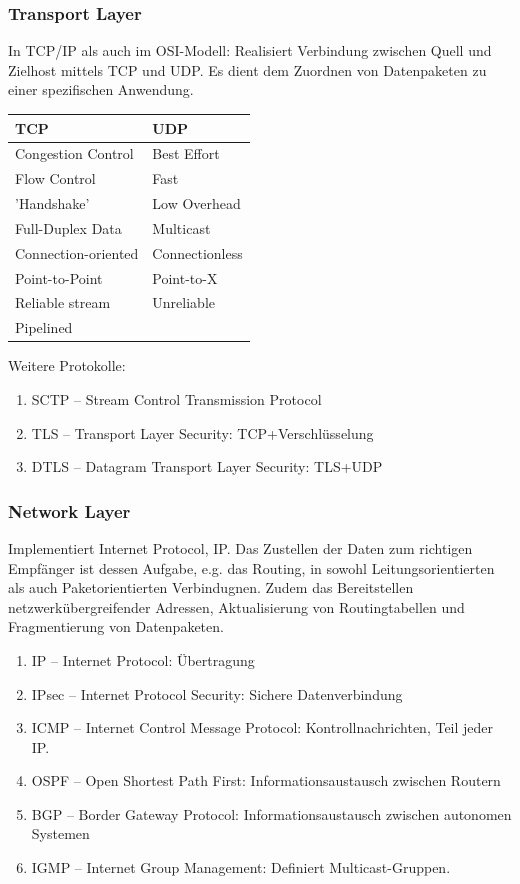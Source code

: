 \documentclass{article}
\begin{document}
    \subsubsection{Transport Layer}
    In TCP/IP als auch im OSI-Modell: Realisiert Verbindung zwischen Quell und Zielhost mittels TCP und UDP. Es dient dem Zuordnen von Datenpaketen zu einer spezifischen Anwendung.
    \begin{center}
        \begin{tabular}{l|l}
        TCP & UDP                               \\\hline
        Congestion Control  &   Best Effort     \\
    Flow Control        &   Fast            \\
        'Handshake'         &   Low Overhead    \\
        Full-Duplex Data    &   Multicast       \\
        Connection-oriented &   Connectionless  \\
        Point-to-Point      &   Point-to-X      \\
        Reliable stream     &   Unreliable      \\
        Pipelined           &                   \\
    \end{tabular}
    \end{center}
    Weitere Protokolle:
    \begin{enumerate}
        \item SCTP -- Stream Control Transmission Protocol
        \item TLS -- Transport Layer Security: TCP+Verschlüsselung
        \item DTLS -- Datagram Transport Layer Security: TLS+UDP
    \end{enumerate}

    \subsubsection{Network Layer}
    Implementiert Internet Protocol, IP. Das Zustellen der Daten zum richtigen Empfänger ist dessen Aufgabe, e.g. das Routing, in sowohl Leitungsorientierten als auch Paketorientierten Verbindugnen. Zudem das Bereitstellen netzwerkübergreifender Adressen, Aktualisierung von Routingtabellen und Fragmentierung von Datenpaketen. 
    \begin{enumerate}
        \item IP -- Internet Protocol: Übertragung
        \item IPsec -- Internet Protocol Security: Sichere Datenverbindung
        \item ICMP -- Internet Control Message Protocol: Kontrollnachrichten, Teil jeder IP.
        \item OSPF -- Open Shortest Path First: Informationsaustausch zwischen Routern
        \item BGP -- Border Gateway Protocol: Informationsaustausch zwischen autonomen Systemen
        \item IGMP -- Internet Group Management: Definiert Multicast-Gruppen.
    \end{enumerate}
\end{document}
